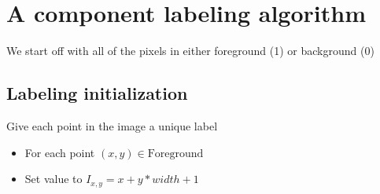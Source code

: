\documentclass[letterpaper,10pt,english]{sphinxmanual}
\begin{document}
\begin{sphinxVerbatim}[commandchars=\\\{\}]
    
\end{sphinxVerbatim}

\noindent{}


\chapter{A component labeling algorithm}
\label{\detokenize{06-ShapeAnalysis:a-component-labeling-algorithm}}
\sphinxAtStartPar
We start off with all of the pixels in either foreground (1) or background (0)

\begin{sphinxVerbatim}[commandchars=\\\{\}]
   
\PYG{p}{[} \PYG{p}{]}  
  \PYG{p}{[}\PYG{p}{]}
  
\end{sphinxVerbatim}

\noindent{}


\section{Labeling initialization}
\label{\detokenize{06-ShapeAnalysis:labeling-initialization}}
\sphinxAtStartPar
Give each point in the image a unique label
\begin{itemize}
\item {} 
\sphinxAtStartPar
For each point \((x,y)\in\text{Foreground}\)

\item {} 
\sphinxAtStartPar
Set value to \(I_{x,y} = x+y*width+1\)

\end{itemize}
\end{document}
